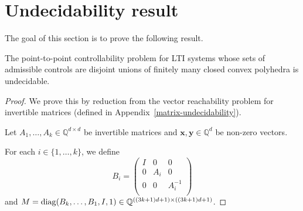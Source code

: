 \section{Undecidability result}

The goal of this section is to prove the following result.

\begin{theorem}
The point-to-point controllability problem for LTI systems whose sets of admissible controls are disjoint unions of finitely many closed convex polyhedra is undecidable.
\end{theorem}

\begin{proof}
We prove this by reduction from the vector reachability problem for invertible matrices (defined in Appendix~\ref{matrix-undecidability}).

Let $A_{1}, \ldots, A_{k} \in \mathbb{Q}^{d \times d}$ be invertible matrices and $\boldsymbol{x}, \boldsymbol{y} \in \mathbb{Q}^{d}$ be non-zero vectors.

For each $i \in \lbrace 1, \ldots, k \rbrace$, we define
\begin{equation*}
B_{i} =
\begin{pmatrix}
I & 0 & 0 \\
0 & A_{i} & 0 \\
0 & 0 & A_{i}^{-1} \\
\end{pmatrix}
\end{equation*}
and $M = \operatorname{diag}(B_{k}, \ldots, B_{1}, I, 1) \in \mathbb{Q}^{((3k+1)d+1) \times ((3k+1)d+1)}$.


\end{proof}
